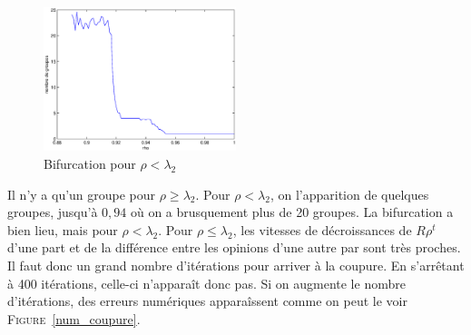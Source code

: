 \documentclass[12pt]{article}
\def\fig#1{\textsc{Figure}~\ref{#1}}
\begin{document}
\begin{figure}[htb]
	\begin{center}
		\includegraphics[width=0.5\textwidth]{bifur}
		\caption{Bifurcation pour $\rho < \lambda_2$}
		\label{bifu_map}
	\end{center}
\end{figure}

Il n'y a qu'un groupe pour $\rho \geq \lambda_2$. Pour $\rho < \lambda_2$, on l'apparition de quelques groupes, jusqu'à $0,94$ où
on a brusquement plus de 20 groupes. La bifurcation a bien lieu, mais pour $\rho < \lambda_2$. Pour $\rho \leq \lambda_2$, les
vitesses de décroissances de $R\rho^t$ d'une part et de la différence entre les opinions d'une autre par sont très proches. Il
faut donc un grand nombre d'itérations pour arriver à la coupure. En s'arrêtant à 400 itérations, celle-ci n'apparaît donc pas.
Si on augmente le nombre d'itérations, des erreurs numériques apparaîssent comme on peut le voir \fig{num_coupure}.
\end{document}
